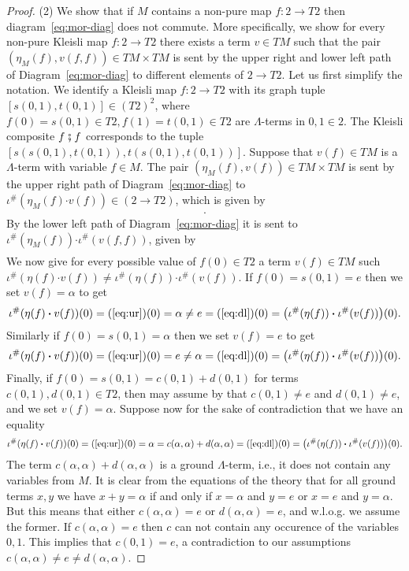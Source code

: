 \documentclass[a4paper, UKenglish, numberwithinsect, thm-restate, cleveref, final]{lipics-v2021}
\theoremstyle{plain}
\theoremstyle{definition}
\newcommand{\mult}{\mathbin{\boldsymbol{\cdot}}}
\newcommand{\kseq}{\ensuremath{\mathrel{\fatsemi}}}
\numberwithin{equation}{section}
\begin{document}
\begin{proof}
  \medskip\noindent(2) We show that if $M$ contains a non-pure map $f \colon 2 \rightarrow T2$ then diagram~\ref{eq:mor-diag} does not commute.
  More specifically, we show for every non-pure Kleisli map $f \colon 2 \rightarrow T2$ there exists a term $v \in TM$ such that the pair $(\eta_{M}(f), v(f, f)) \in TM \times TM$ is sent by the upper right and lower left path of Diagram~\ref{eq:mor-diag} to different elements of $2 \rightarrow T 2$.
  Let us first simplify the notation.
  We identify a Kleisli map $f \colon 2 \to T 2 $ with its graph tuple $[s(0, 1), t(0, 1)] \in (T2)^2$, where $f(0) = s(0, 1) \in T 2, f(1)= t(0, 1) \in T 2$ are $\Lambda$-terms in $0, 1 \in 2$.
  The Kleisli composite $f \kseq f$ corresponds to the tuple $[s(s(0, 1), t(0, 1)), t(s(0, 1), t(0, 1))]$.
  Suppose that $v(f) \in TM$ is a $\Lambda$-term with variable $f \in M$.
  The pair $(\eta_{M}(f), v(f)) \in TM \times TM$ is sent by the upper right path of Diagram~\ref{eq:mor-diag} to $\iota^{\#}(\eta_{M}(f) \mult v(f)) \in (2 \rightarrow T 2)$, which is given by
  \begin{align}
[v(s(s(0, 1), t(0, 1))),
v(t(s(0, 1), t(0, 1)))].\label{eq:ur}
\end{align}
By the lower left path of Diagram~\ref{eq:mor-diag} it is sent to $\iota^{\#}(\eta_{M}(f)) \mult \iota^{\#}(v(f, f))$, given by
\begin{align}
[s(v(s(0, 1)), v(t(0, 1))), t(v(s(0, 1)), v(t(0, 1)))] \label{eq:dl}
\end{align}
We now give for every possible value of $f(0) \in T2$  a term $v(f) \in TM$ such $\iota^{\#}(\eta(f) \mult v(f)) \ne \iota^{\#}(\eta(f)) \mult \iota^{\#}(v(f))$.
If $f(0) = s(0, 1) = e$ then we set $v(f) = \alpha$ to get
\[\iota^{\#}(\eta(f) \mult v(f))(0) = \text{(\ref{eq:ur})}(0) = \alpha \ne e = \text{(\ref{eq:dl})}(0) =   \big(\iota^{\#}(\eta(f)) \mult \iota^{\#}(v(f))\big)(0).\]
Similarly if $f(0) = s(0, 1) = \alpha$ then we set $v(f) = e$ to get
\[\iota^{\#}(\eta(f) \mult v(f))(0) = \text{(\ref{eq:ur})}(0) = e \ne \alpha = \text{(\ref{eq:dl})}(0) =  \big(\iota^{\#}(\eta(f)) \mult \iota^{\#}(v(f))\big)(0).\]
Finally, if $f(0) = s(0, 1) = c(0, 1) + d(0, 1)$ for terms $c(0, 1), d(0, 1) \in T2$, then may assume by  that $c(0, 1) \ne e$ and $d(0, 1) \ne e$, and we set $v(f) = \alpha$.
Suppose now for the sake of contradiction that we have an equality \[\iota^{\#}(\eta(f) \mult v(f))(0) = \text{(\ref{eq:ur})}(0) = \alpha  = c(\alpha, \alpha) + d(\alpha, \alpha) = \text{(\ref{eq:dl})}(0) =  \big(\iota^{\#}(\eta(f)) \mult \iota^{\#}(v(f))\big)(0). \]
The term $c(\alpha, \alpha) + d(\alpha, \alpha)$ is a ground $\Lambda$-term, i.e., it does not contain any variables from $M$.
It is clear from the equations of the theory that for all ground terms $x, y $ we have $x + y = \alpha$ if and only if $x = \alpha$ and $y = e$ or $x = e$ and $ y = \alpha$. But this means that either $c(\alpha, \alpha) = e$ or $d(\alpha, \alpha) = e$, and w.l.o.g. we assume the former. If $c(\alpha, \alpha) = e$ then $c$ can not contain any occurence of the variables $0, 1$. This implies that $c(0, 1) = e$, a contradiction to our assumptions $c(\alpha, \alpha) \ne e \ne d(\alpha, \alpha)$.


\end{proof}
\end{document}
